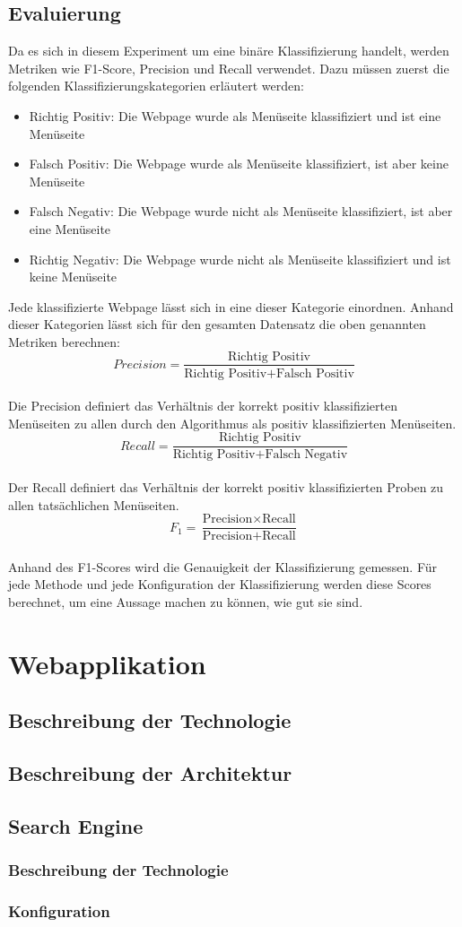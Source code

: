 \subsection{Evaluierung}
Da es sich in diesem Experiment um eine binäre Klassifizierung handelt, werden Metriken wie F1-Score, Precision und Recall verwendet.
Dazu müssen zuerst die folgenden Klassifizierungskategorien erläutert werden:
\begin{itemize}
	\item Richtig Positiv: Die Webpage wurde als Menüseite klassifiziert und ist eine Menüseite
	\item Falsch Positiv: Die Webpage wurde als Menüseite klassifiziert, ist aber keine Menüseite
	\item Falsch Negativ: Die Webpage wurde nicht als Menüseite klassifiziert, ist aber eine Menüseite
	\item Richtig Negativ: Die Webpage wurde nicht als Menüseite klassifiziert und ist keine Menüseite
\end{itemize}
Jede klassifizierte Webpage lässt sich in eine dieser Kategorie einordnen.
Anhand dieser Kategorien lässt sich für den gesamten Datensatz die oben genannten Metriken berechnen:\\
\[Precision=\frac{\text{Richtig Positiv}}{\text{Richtig Positiv} + \text{Falsch Positiv}}\]\\
Die Precision definiert das Verhältnis der korrekt positiv klassifizierten Menüseiten zu allen durch den Algorithmus als positiv klassifizierten Menüseiten.\\
\[Recall=\frac{\text{Richtig Positiv}}{\text{Richtig Positiv} + \text{Falsch Negativ}}\]\\
Der Recall definiert das Verhältnis der korrekt positiv klassifizierten Proben zu allen tatsächlichen Menüseiten.\\
\[F_{1}=\frac{\text{Precision} \times \text{Recall}}{\text{Precision} + \text{Recall}}\]\\
Anhand des F1-Scores wird die Genauigkeit der Klassifizierung gemessen.
Für jede Methode und jede Konfiguration der Klassifizierung werden diese Scores berechnet, um eine Aussage machen zu können, wie gut sie sind.
\section{Webapplikation}
\subsection{Beschreibung der Technologie}
\subsection{Beschreibung der Architektur}
\subsection{Search Engine}
\subsubsection{Beschreibung der Technologie}
\subsubsection{Konfiguration}